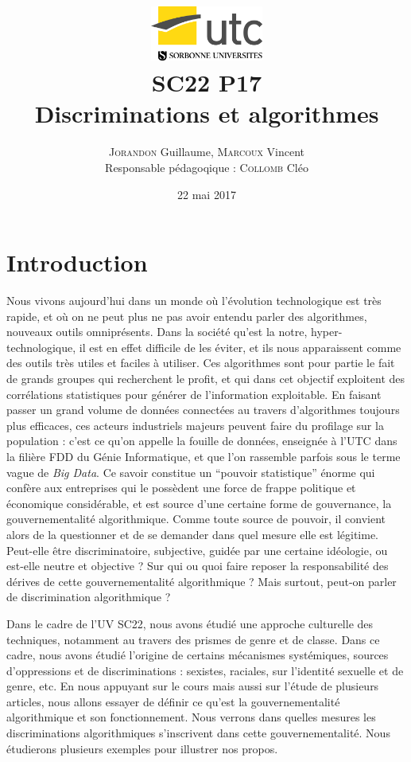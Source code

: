 \documentclass[a4paper,12pt]{report}
\author{\textsc{Jorandon} Guillaume, \textsc{Marcoux} Vincent\\\small{Responsable pédagoqique : \textsc{Collomb} Cléo}}
\date{22 mai 2017}
\title{\includegraphics[width=140px]{utc.jpg}\\\vspace{25mm}SC22 P17\\\normalsize{Discriminations et algorithmes}}
\begin{document}
\hypersetup{pageanchor=false}
\maketitle
\tableofcontents
\hypersetup{pageanchor=true}
\chapter*{Introduction}
Nous vivons aujourd'hui dans un monde où l'évolution technologique est très rapide, et où on ne peut plus ne pas avoir entendu parler des algorithmes, nouveaux outils omniprésents. Dans la société qu'est la notre, hyper-technologique, il est en effet difficile de les éviter, et ils nous apparaissent comme des outils très utiles et faciles à utiliser. Ces algorithmes sont pour partie le fait de grands groupes qui recherchent le profit, et qui dans cet objectif exploitent des corrélations statistiques pour générer de l'information exploitable. En faisant passer un grand volume de données connectées au travers d'algorithmes toujours plus efficaces, ces acteurs industriels majeurs peuvent faire du profilage sur la population : c'est ce qu'on appelle la fouille de données, enseignée à l'UTC dans la filière FDD du Génie Informatique, et que l'on rassemble parfois sous le terme vague de \textit{Big Data}. Ce savoir constitue un ``pouvoir statistique'' énorme qui confère aux entreprises qui le possèdent une force de frappe politique et économique considérable, et est source d'une certaine forme de gouvernance, la gouvernementalité algorithmique. Comme toute source de pouvoir, il convient alors de la questionner et de se demander dans quel mesure elle est légitime. Peut-elle être discriminatoire, subjective, guidée par une certaine idéologie, ou est-elle neutre et objective ? Sur qui ou quoi faire reposer la responsabilité des dérives de cette gouvernementalité algorithmique ? Mais surtout, peut-on parler de discrimination algorithmique ? 

Dans le cadre de l'UV SC22, nous avons étudié une approche culturelle des techniques, notamment au travers des prismes de genre et de classe. Dans ce cadre, nous avons étudié l'origine de certains mécanismes systémiques, sources d'oppressions et de discriminations : sexistes, raciales, sur l'identité sexuelle et de genre, etc. En nous appuyant sur le cours mais aussi sur l'étude de plusieurs articles, nous allons essayer de définir ce qu'est la gouvernementalité algorithmique et son fonctionnement. Nous verrons dans quelles mesures les discriminations algorithmiques s'inscrivent dans cette gouvernementalité. Nous étudierons plusieurs exemples pour illustrer nos propos.

\appendix


\end{document}
